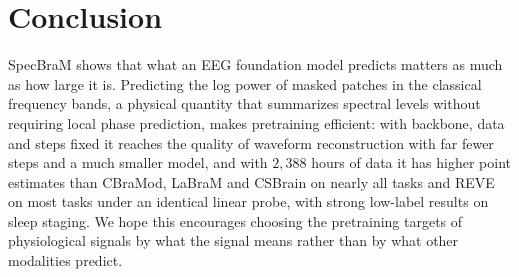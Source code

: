 \section{Conclusion}
SpecBraM shows that what an EEG foundation model predicts matters as much as how large it is.
Predicting the log power of masked patches in the classical frequency bands, a physical
quantity that summarizes spectral levels without requiring local phase prediction, makes pretraining
efficient: with backbone, data and steps fixed it reaches the quality of waveform
reconstruction with far fewer steps and a much smaller model, and with $2{,}388$ hours of data
it has higher point estimates than CBraMod, LaBraM and CSBrain on nearly all tasks and REVE on
most tasks under an identical linear probe, with strong low-label results on sleep staging.
We hope this encourages choosing the pretraining
targets of physiological signals by what the signal means rather than by what other modalities
predict.


